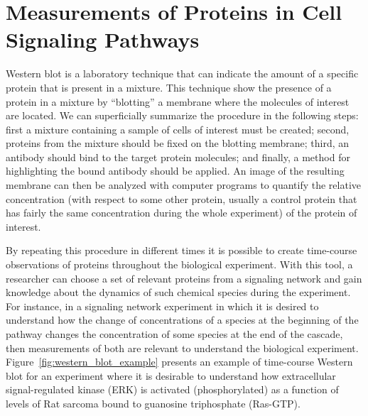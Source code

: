 \section{Measurements of Proteins in Cell Signaling Pathways}
Western blot is a laboratory technique that can indicate the amount of a
specific protein that is present in a mixture. This technique show the 
presence of a protein in a mixture by ``blotting'' a membrane where the 
molecules of interest are located. We can superficially summarize the 
procedure in the following steps: first a mixture containing a sample of 
cells of interest must be created; second, proteins from the mixture 
should be fixed on the blotting membrane; third, an antibody should bind 
to the target protein molecules; and finally, a method for highlighting 
the bound antibody should be applied. An image of the resulting membrane 
can then be analyzed with computer programs to quantify the relative 
concentration (with respect to some other protein, usually a control 
protein that has fairly the same concentration during the whole 
experiment) of the protein of interest.

By repeating this procedure in different times it is possible to create 
time-course observations of proteins throughout the biological 
experiment. With this tool, a researcher can choose a set of relevant 
proteins from a signaling network and gain knowledge about the dynamics 
of such chemical species during the experiment. For instance, in a 
signaling network experiment in which it is desired to understand how
the change of concentrations of a species at the beginning of the 
pathway changes the concentration of some species at the end of the 
cascade, then measurements of both are relevant to understand the 
biological experiment. Figure~\ref{fig:western_blot_example} presents an 
example of time-course Western blot for an experiment where it is 
desirable to understand how extracellular signal-regulated kinase (ERK)
is activated (phosphorylated) as a function of levels of Rat sarcoma
bound to guanosine triphosphate (Ras-GTP).

